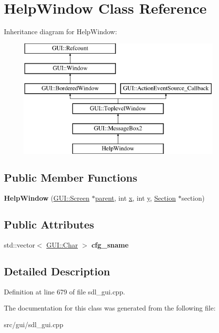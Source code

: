 \hypertarget{classHelpWindow}{\section{Help\-Window Class Reference}
\label{classHelpWindow}
}
Inheritance diagram for Help\-Window\-:\begin{figure}[H]
\begin{center}
\leavevmode
\includegraphics[height=6.000000cm]{classHelpWindow}
\end{center}
\end{figure}
\subsection*{Public Member Functions}
\begin{DoxyCompactItemize}
\item 
\hypertarget{classHelpWindow_a187ef189ba63c6c5ecf56aea58890d91}{{\bfseries Help\-Window} (\hyperlink{classGUI_1_1Screen}{G\-U\-I\-::\-Screen} $\ast$\hyperlink{classGUI_1_1Window_a2e593ff65e7702178d82fe9010a0b539}{parent}, int \hyperlink{classGUI_1_1Window_a6ca6a80ca00c9e1d8ceea8d3d99a657d}{x}, int \hyperlink{classGUI_1_1Window_a0ee8e923aff2c3661fc2e17656d37adf}{y}, \hyperlink{classSection}{Section} $\ast$section)}\label{classHelpWindow_a187ef189ba63c6c5ecf56aea58890d91}

\end{DoxyCompactItemize}
\subsection*{Public Attributes}
\begin{DoxyCompactItemize}
\item 
\hypertarget{classHelpWindow_ab055ab815415faa5398c696f0947ae33}{std\-::vector$<$ \hyperlink{namespaceGUI_af6b04b46d40197b4f00e553d7d1a3e4c}{G\-U\-I\-::\-Char} $>$ {\bfseries cfg\-\_\-sname}}\label{classHelpWindow_ab055ab815415faa5398c696f0947ae33}

\end{DoxyCompactItemize}


\subsection{Detailed Description}


Definition at line 679 of file sdl\-\_\-gui.\-cpp.



The documentation for this class was generated from the following file\-:\begin{DoxyCompactItemize}
\item 
src/gui/sdl\-\_\-gui.\-cpp\end{DoxyCompactItemize}
